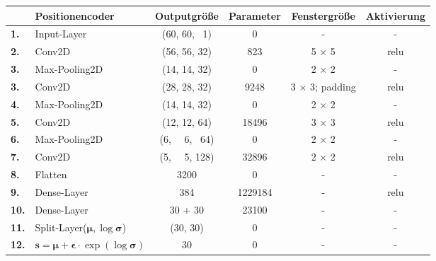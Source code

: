 \documentclass[12pt]{article}
\begin{document}
	\begin{table}[htb]
		\begin{center}
			\begin{tabular}{llcccc}\toprule
				\textbf{\ }	&\textbf{Positionencoder}	&\textbf{Outputgröße} &\textbf{Parameter} &\textbf{Fenstergröße} &\textbf{Aktivierung}\\
				\midrule
				\textbf{1.}	&Input-Layer	& (60, 60, \ 1)		& 0		& - 			&- \\
				\textbf{2.}	&Conv2D 		& (56, 56, 32)		& 823	& 5 $\times$ 5	&relu \\
				\textbf{3.}	&Max-Pooling2D	& (14, 14, 32)		& 0		& 2 $\times$ 2	&- \\
				\textbf{3.}	&Conv2D 		& (28, 28, 32)		& 9248	& 3 $\times$ 3; padding	&relu \\
				\textbf{4.}	&Max-Pooling2D	& (14, 14, 32)		& 0		& 2 $\times$ 2	&- \\
				\textbf{5.}	&Conv2D			& (12, 12, 64)		& 18496	& 3 $\times$ 3	&relu \\
				\textbf{6.}	&Max-Pooling2D	& (6, \ \ 6, \ 64)	& 0		& 2 $\times$ 2 	&- \\
				\textbf{7.}	&Conv2D			& (5, \ \ 5,  128)	& 32896	& 2 $\times$ 2 	&relu \\
				\textbf{8.}	&Flatten		& 3200				& 0		& - 			&- \\
				\textbf{9.}	&Dense-Layer	& 384				&1229184& - 			&relu \\
				\textbf{10.}&Dense-Layer 	& 30 + 30			& 23100	& - 			&- \\
				\textbf{11.}&Split-Layer($\boldsymbol{\mu}, \log\boldsymbol{\sigma}$)   & (30, 30)				& 0	& - 			&- \\
				\textbf{12.}&$\mathbf{s}=\boldsymbol{\mu}+\boldsymbol{\epsilon}\cdot\exp(\log\boldsymbol{\sigma})$	& 30				& 0	& - 			&-\\
				\bottomrule
			\end{tabular}
		\end{center}
	\end{table}
\end{document}
